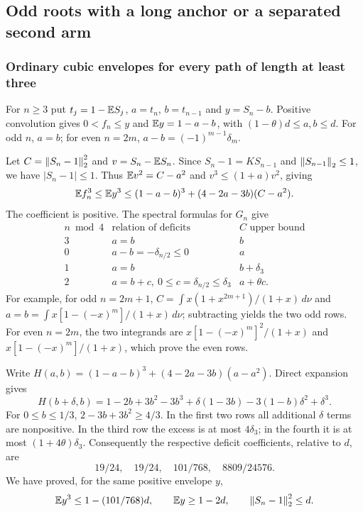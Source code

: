 \subsection{Odd roots with a long anchor or a separated second arm}\label{q3:app:odd}
\subsubsection{Ordinary cubic envelopes for every path of length at least three}
For $n\ge3$ put $t_j=1-\mathbb E S_j$, $a=t_n$, $b=t_{n-1}$ and $y=S_n-b$. Positive convolution gives $0<f_n\le y$ and $\mathbb E y=1-a-b$, with $(1-\theta)d\le a,b\le d$. For odd $n$, $a=b$; for even $n=2m$, $a-b=(-1)^{m-1}\delta_{m}$.

Let $C=\left\lVert S_n-1\right\rVert_2^2$ and $v=S_n-\mathbb E S_n$. Since $S_n-1=KS_{n-1}$ and $\left\lVert S_{n-1}\right\rVert_2\le1$, we have $|S_n-1|\le1$. Thus $\mathbb E v^2=C-a^2$ and $v^3\le(1+a)v^2$, giving
\begin{equation}\label{q3:eq:pathcubicenvelope}
 \mathbb E f_n^3\le\mathbb E y^3
 \le(1-a-b)^3+(4-2a-3b)(C-a^2).
\end{equation}
The coefficient is positive. The spectral formulas for $G_n$ give
\[
\begin{array}{c|c|c}
n\bmod4&\text{relation of deficits}&C\text{ upper bound}\\\hline
3&a=b&b\\
0&a-b=-\delta_{n/2}\le0&a\\
1&a=b&b+\delta_{3}\\
2&a=b+c,\ 0\le c=\delta_{n/2}\le \delta_{3}&a+\theta c.
\end{array}
\]
For example, for odd $n=2m+1$,
$C=\int x(1+x^{2m+1})/(1+x)\,d\nu$ and
$a=b=\int x[1-(-x)^m]/(1+x)\,d\nu$; subtracting yields the two odd rows. For even $n=2m$, the two integrands are $x[1-(-x)^m]^2/(1+x)$ and $x[1-(-x)^m]/(1+x)$, which prove the even rows.

Write $H(a,b)=(1-a-b)^3+(4-2a-3b)(a-a^2)$. Direct expansion gives
\[
 H(b+\delta,b)=1-2b+3b^2-3b^3+
 \delta(1-3b)-3(1-b)\delta^2+\delta^3.
\]
For $0\le b\le1/3$, $2-3b+3b^2\ge4/3$. In the first two rows all additional $\delta$ terms are nonpositive. In the third row the excess is at most $4\delta_{3}$; in the fourth it is at most $(1+4\theta)\delta_{3}$. Consequently the respective deficit coefficients, relative to $d$, are
\[
 19/24,\quad19/24,\quad101/768,\quad8809/24576.
\]
We have proved, for the same positive envelope $y$,
\begin{equation}\label{q3:eq:allpathcubic}
 \mathbb E y^3\le1-(101/768)d,\qquad
 \mathbb E y\ge1-2d,\qquad \left\lVert S_n-1\right\rVert_2^2\le d.
\end{equation}

